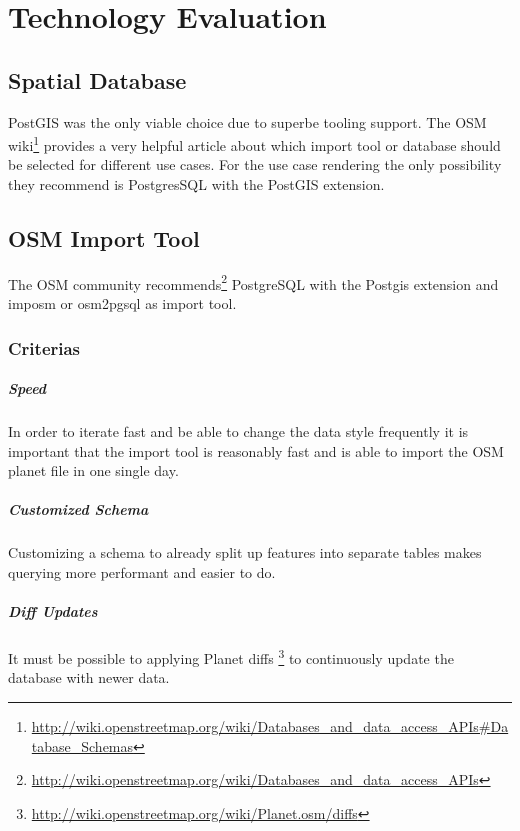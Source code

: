 \chapter{Technology Evaluation}\label{technology_evaluation}

\section{Spatial Database}\label{spatial_database}

PostGIS was the only viable choice due to superbe tooling support. The OSM wiki\footnote{\url{http://wiki.openstreetmap.org/wiki/Databases_and_data_access_APIs#Database_Schemas}} provides a very helpful article about which import tool or database should be selected for different use cases. For the use case rendering the only possibility they recommend is PostgresSQL with the PostGIS extension. 

\section{OSM Import Tool}\label{osm-import-tool}
The OSM community
recommends\footnote{\url{http://wiki.openstreetmap.org/wiki/Databases_and_data_access_APIs}}
PostgreSQL with the Postgis extension and imposm or osm2pgsql as import tool.

\subsection{Criterias}

\paragraph{Speed} 
In order to iterate fast and be able to change the data style frequently
it is important that the import tool is reasonably fast and is able
to import the OSM planet file in one single day.

\paragraph{Customized Schema}
Customizing a schema to already split up features into separate tables
makes querying more performant and easier to do.

\paragraph{Diff Updates}
It must be possible to applying Planet diffs \footnote{\url{http://wiki.openstreetmap.org/wiki/Planet.osm/diffs}} 
to continuously update the database with newer data.

